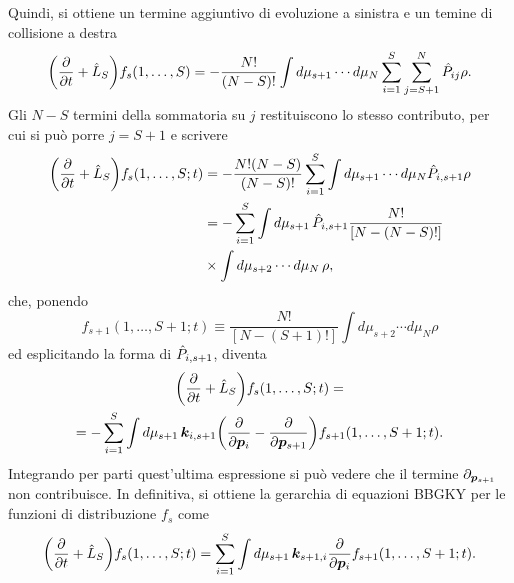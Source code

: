 Quindi, si ottiene un termine aggiuntivo di evoluzione a sinistra e un temine di collisione a destra
\begin{equation}
    \bigg(\frac{\partial}{\partial t} + \hat{L}_S\bigg)f_s(1,\dots,S) = -\frac{N!}{(N-S)!}\int d\mu_{s+1}\cdots d\mu_N\sum_{i=1}^S\sum_{j=S+1}^N\hat{P}_{ij}\rho.
\end{equation}
Gli $N-S$ termini della sommatoria su $j$ restituiscono lo stesso contributo, per cui si può porre $j=S+1$ e scrivere
\begin{equation}
    \begin{split}
        \bigg(\frac{\partial}{\partial t} + \hat{L}_S\bigg)f_s(1,\dots,S;t) &= -\frac{N!(N-S)}{(N-S)!}\sum_{i=1}^S\int d\mu_{s+1}\cdots d\mu_N\hat{P}_{i,s+1}\rho \\
        &=-\sum_{i=1}^S\int d\mu_{s+1}\,\hat{P}_{i,s+1}\frac{N!}{[N-(N-S)!]} \\
        &\times\int d\mu_{s+2}\cdots d\mu_N\,\rho,
    \end{split}
\end{equation}
che, ponendo 
\begin{equation}
    f_{s+1}(1,\dots,S+1;t) \equiv \frac{N!}{[N-(S+1)!]} \int d\mu_{s+2}\cdots d\mu_N\rho
\end{equation}
ed esplicitando la forma  di $\hat{P}_{i,s+1}$, diventa
\begin{multline}
    \bigg(\frac{\partial}{\partial t} + \hat{L}_S\bigg)f_s(1,\dots,S;t) = \\
    =-\sum_{i=1}^S\int d\mu_{s+1}\,\bm{k}_{i,s+1}\bigg(\frac{\partial}{\partial \bm{p}_i} - \frac{\partial}{\partial \bm{p}_{s+1}}\bigg)f_{s+1}(1,\dots,S+1;t).
\end{multline}
Integrando per parti quest'ultima espressione si può vedere che il termine $\partial_{\bm{p}_{s+1}}$ non contribuisce. In definitiva, si ottiene la gerarchia di equazioni BBGKY per le funzioni di distribuzione $f_s$ come
\begin{equation}
\label{eq: gerarchia BBGKY}
    \bigg(\frac{\partial}{\partial t} + \hat{L}_S\bigg)f_s(1,\dots,S;t) = \sum_{i=1}^S\int d\mu_{s+1}\,\bm{k}_{s+1,i}\frac{\partial}{\partial \bm{p}_i}f_{s+1}(1,\dots,S+1;t).
\end{equation}

